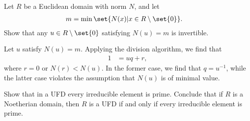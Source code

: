 \documentclass[10pt]{mypackage}
\begin{document}
\RaggedRight
\begin{problem}[Problem 1]
  Let $R$ be a Euclidean domain with norm $N$, and let
  \begin{align*}
    m &= \min\set{N(x) | x\in R\setminus \set{0}}.
  \end{align*}
  Show that any $u\in R\setminus \set{0}$ satisfying $N(u) = m$ is invertible.
\end{problem}
\begin{solution}
  Let $u$ satisfy $N(u) = m$. Applying the division algorithm, we find that
  \begin{align*}
    1 &= uq + r,
  \end{align*}
  where $r = 0$ or $N(r) < N(u)$. In the former case, we find that $q = u^{-1}$, while the latter case violates the assumption that $N(u)$ is of minimal value.
\end{solution}
\begin{problem}[Problem 2]
  Show that in a UFD every irreducible element is prime. Conclude that if $R$ is a Noetherian domain, then $R$ is a UFD if and only if every irreducible element is prime.
\end{problem}
\end{document}
